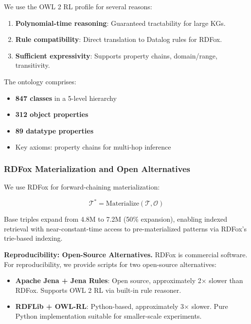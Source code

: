 \documentclass[10pt,twocolumn]{article}
\begin{document}
We use the OWL 2 RL profile \cite{motik2012owl2} for several reasons:
\begin{enumerate}
    \item \textbf{Polynomial-time reasoning}: Guaranteed tractability for large KGs.
    \item \textbf{Rule compatibility}: Direct translation to Datalog rules for RDFox.
    \item \textbf{Sufficient expressivity}: Supports property chains, domain/range, transitivity.
\end{enumerate}

The ontology comprises:
\begin{itemize}
    \item \textbf{847 classes} in a 5-level hierarchy
    \item \textbf{312 object properties}
    \item \textbf{89 datatype properties}
    \item Key axioms: property chains for multi-hop inference
\end{itemize}

\subsubsection{RDFox Materialization and Open Alternatives}
\label{sec:rdfox}

We use RDFox \cite{rdfox2023} for forward-chaining materialization:

\begin{equation}
\mathcal{T}^* = \text{Materialize}(\mathcal{T}, \mathcal{O})
\end{equation}

Base triples expand from 4.8M to 7.2M (50\% expansion), enabling indexed retrieval with near-constant-time access to pre-materialized patterns via RDFox's trie-based indexing.

\textbf{Reproducibility: Open-Source Alternatives.} RDFox is commercial software. For reproducibility, we provide scripts for two open-source alternatives:

\begin{itemize}
    \item \textbf{Apache Jena + Jena Rules}: Open source, approximately 2$\times$ slower than RDFox. Supports OWL 2 RL via built-in rule reasoner.
    \item \textbf{RDFLib + OWL-RL}: Python-based, approximately 3$\times$ slower. Pure Python implementation suitable for smaller-scale experiments.
\end{itemize}
\end{document}
